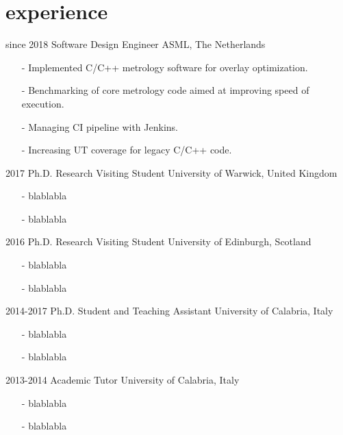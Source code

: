 \documentclass[]{twentysecondscv}
\begin{document}
\section{experience}

\begin{twenty}
  \twentyitem
    {since 2018}
    {Software Design Engineer}
    {ASML, The Netherlands}
	{
		\vspace{-10pt}
		\begin{itemize}[leftmargin=*]
			\footnotesize
			\item[-] Implemented C/C++ metrology software for overlay optimization.
			\item[-] Benchmarking of core metrology code aimed at improving speed of execution.
			\item[-] Managing CI pipeline with Jenkins.
			\item[-] Increasing UT coverage for legacy C/C++ code.
		\end{itemize} 
	}
  \twentyitem
    {2017}
    {Ph.D. {\normalfont Research Visiting Student}}
    {University of Warwick, United Kingdom}
	{
		\vspace{-10pt}
		\begin{itemize}[leftmargin=*]
			\footnotesize
			\item[-] blablabla
			\item[-] blablabla
		\end{itemize} 
	}
  \twentyitem
    {2016}
    {Ph.D. {\normalfont Research Visiting Student}}
    {University of Edinburgh, Scotland}
	{
		\vspace{-10pt}
		\begin{itemize}[leftmargin=*]
			\footnotesize
			\item[-] blablabla
			\item[-] blablabla
		\end{itemize} 
	}
  \twentyitem
    {2014-2017}
    {Ph.D. {\normalfont Student and Teaching Assistant}}
    {University of Calabria, Italy}
	{
		\vspace{-10pt}
		\begin{itemize}[leftmargin=*]
			\item[-] blablabla
			\item[-] blablabla
		\end{itemize} 
	}
  \twentyitem
    {2013-2014}
    {Academic Tutor}
    {University of Calabria, Italy}
    {
	    \vspace{-10pt}
	    \begin{itemize}[leftmargin=*]
	    	\footnotesize
	    	\item[-] blablabla
	    	\item[-] blablabla
	    \end{itemize} 
    }
\end{twenty}
\end{document}
